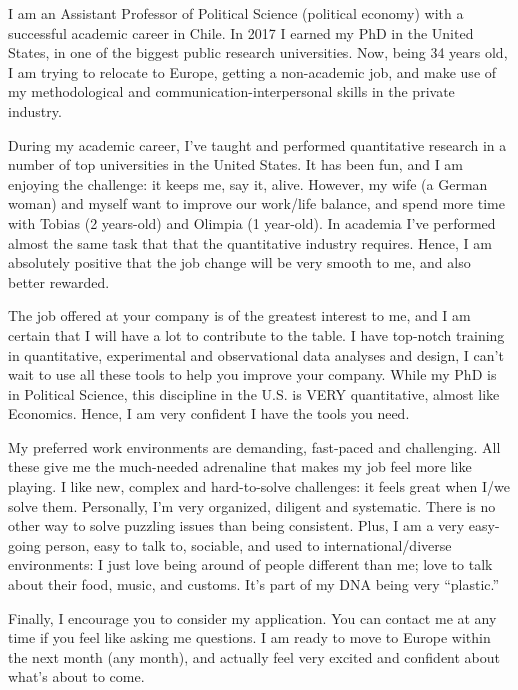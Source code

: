 \documentclass[10pt,stdletter,dateno,sigleft]{newlfm} %
\begin{document}
\begin{newlfm}


I am an Assistant Professor of Political Science (political economy) with a successful academic career in Chile. In 2017 I earned my PhD in the United States, in one of the biggest public research universities. Now, being 34 years old, I am trying to relocate to Europe, getting a non-academic job, and make use of my methodological and communication-interpersonal skills in the private industry.

During my academic career, I've taught and performed quantitative research in a number of top universities in the United States. It has been fun, and I am enjoying the challenge: it keeps me, say it, alive. However, my wife (a German woman) and myself want to improve our work/life balance, and spend more time with Tobias (2 years-old) and Olimpia (1 year-old). In academia I've performed almost the same task that that the quantitative industry requires. Hence, I am absolutely positive that the job change will be very smooth to me, and also better rewarded.

The job offered at your company is of the greatest interest to me, and I am certain that I will have a lot to contribute to the table. I have top-notch training in quantitative, experimental and observational data analyses and design, I can't wait to use all these tools to help you improve your company. While my PhD is in Political Science, this discipline in the U.S. is VERY quantitative, almost like Economics. Hence, I am very confident I have the tools you need. 

My preferred work environments are demanding, fast-paced and challenging. All these give me the much-needed adrenaline that makes my job feel more like playing. I like new, complex and hard-to-solve challenges: it feels great when I/we solve them. Personally, I'm very organized, diligent and systematic. There is no other way to solve puzzling issues than being consistent. Plus, I am a very easy-going person, easy to talk to, sociable, and used to international/diverse environments: I just love being around of people different than me; love to talk about their food, music, and customs. It's part of my DNA being very ``plastic.'' %

Finally, I encourage you to consider my application. You can contact me at any time if you feel like asking me questions. I am ready to move to Europe within the next month (any month), and actually feel very excited and confident about what's about to come.



\end{newlfm}
\end{document}
